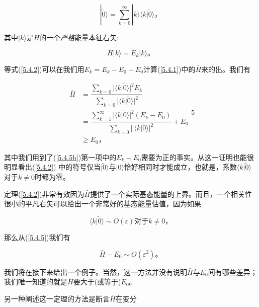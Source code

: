 ﻿\documentclass[UTF8,twoside]{ctexart}
\begin{document}
\begin{equation} \label{5.4.3}
|\tilde{0}\rangle=\displaystyle\sum_{k=0}^{\infty}|k\rangle\langle k|\tilde{0}\rangle\text{，}
\end{equation}

\noindent 其中$|k\rangle$是$H$的一个\emph{严格}能量本征右矢:

\begin{equation} \label{5.4.4}
H|k\rangle=E_k|k\rangle\text{。}
\end{equation}

\noindent 等式(\ref{5.4.2})可以在我们用$E_k=E_k-E_0+E_0$计算(\ref{5.4.1})中的$\bar{H}$来的出。我们有

\begin{subequations} \label{5.4.5a}
\begin{align}
\bar{H}&=\dfrac{\displaystyle\sum_{k=0}|\langle k|\tilde{0}\rangle|^2E_k}{\displaystyle\sum_{k=0}|\langle k|\tilde{0}\rangle|^2}\\
\label{5.4.5b}
&=\dfrac{\displaystyle\sum_{k=1}^{\infty}|\langle k|\tilde{0}\rangle|^2(E_k-E_0)}{\displaystyle\sum_{k=0}|\ \langle k|\tilde{0}\rangle|^2}+E_0\\
\label{5.4.5c}
&\geq E_0\text{，}
\end{align}5
\end{subequations}

\noindent 其中我们用到了(\ref{5.4.5b})第一项中的$E_k-E_0$需要为正的事实。从这一证明也能很明显看出(\ref{5.4.2}) 中的符号仅当$|\tilde{0}\rangle$与$|0\rangle$恰好相同时才能成立，也就是，系数$\langle k|\tilde{0}\rangle$对于$k\neq 0$时都为零。

\noindent 定理(\ref{5.4.2})非常有效因为$\bar{H}$提供了一个实际基态能量的上界。而且，一个相关性很小的平凡右矢可以给出一个非常好的基态能量估值，因为如果

\begin{equation} \label{5.4.6}
\langle k|\tilde{0}\rangle\sim O(\varepsilon) \text{对于}k\neq0\text{，}
\end{equation}

\noindent 那么从(\ref{5.4.5})我们有

\begin{equation} \label{5.4.7}
\bar{H}-E_0\sim O(\varepsilon^2)\text{。}
\end{equation}

\noindent 我们将在接下来给出一个例子。当然，这一方法并没有说明$\bar{H}$与$E_0$间有哪些差异；我们唯一知道的就是$\bar{H}$要大于(或等于)$E_0$。

另一种阐述这一定理的方法是断言$\bar{H}$在变分
\end{document}
